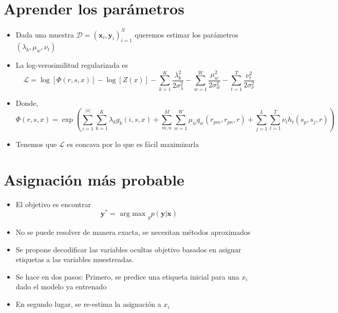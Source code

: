 \documentclass[11pt]{article}
\theoremstyle{plain}
\begin{document}
\section{Aprender los parámetros}
\begin{itemize}
\item Dada una muestra $\mathcal{D}= (\mathbf{x}_i, \mathbf{y}_i)_{i=1}^N$ queremos estimar los parámetros $(\lambda_k,\mu_w,\nu_t)$
\item La log-verosimilitud regularizada es
\[ \mathcal{L} = \log [\Phi(r,s,x)] - \log [Z(x)] - \sum_{k=1}^K \frac{\lambda_k^2}{2 \sigma_\lambda^2} - \sum_{w=1}^W \frac{\mu_w^2}{2 \sigma_w^2} - \sum_{t=1}^T \frac{\nu_t^2}{2 \sigma_\nu^2} \]
\item Donde,
\[ \Phi(r,s,x) = \exp (\sum_{i=1}^{|s|} \sum_{k=1}^K \lambda_k g_k(i,s,x) + \sum_{m,n}^M \sum_{w=1}^W \mu_w q_w (r_{pm},r_{pn},r) + \sum_{j=1}^L \sum_{t=1}^T  \nu_t h_t(s_p,s_j,r)) \]
\item Tenemos que $\mathcal{L}$ es concava por lo que es fácil maximizarla
\end{itemize}
\section{Asignación más probable}
\begin{itemize}
\item El objetivo es encontrar
\[ \mathbf{y}^\ast = \textrm{ arg max }_y p(\mathbf{y}| \mathbf{x})\]
\item No se puede resolver de manera exacta, se necesitan métodos aproximados
\item Se propone decodificar las variables ocultas objetivo basados en asignar etiquetas a las variables muestreadas.
\item Se hace en dos pasos: Primero, se predice una etiqueta inicial para una $x_i$ dado el modelo ya entrenado
\item En segundo lugar, se re-estima la asignación a $x_i$
\end{itemize}
\end{document}

